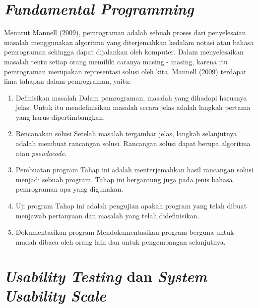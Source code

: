 \section{\textit{Fundamental Programming}}
	Menurut Mannell (2009), pemrograman adalah sebuah proses dari penyelesaian masalah menggunakan algoritma yang diterjemahkan kedalam notasi atau bahasa pemrograman sehingga dapat dijalankan oleh komputer. Dalam menyelesaikan masalah tentu setiap orang memiliki caranya masing - masing, karena itu pemrograman merupakan representasi solusi oleh kita.
	\linebreak\linebreak
	Mannell (2009) terdapat lima tahapan dalam pemrograman, yaitu:
	\begin{enumerate}
		\item Definisikan masalah
			\subitem Dalam pemrograman, masalah yang dihadapi harusnya jelas. Untuk itu mendefinisikan masalah secara jelas adalah langkah pertama yang harus dipertimbangkan.
		\item Rencanakan solusi
			\subitem Setelah masalah tergambar jelas, langkah selanjutnya adalah membuat rancangan solusi. Rancangan solusi dapat berupa algoritma atau \textit{pseudocode}.
		\item Pembuatan program
			\subitem Tahap ini adalah menterjemahkan hasil rancangan solusi menjadi sebuah program. Tahap ini bergantung juga pada jenis bahasa pemrograman apa yang digunakan.
		\item Uji program
			\subitem Tahap ini adalah pengujian apakah program yang telah dibuat menjawab pertanyaan dan masalah yang telah didefinisikan.
		\item Dokumentasikan program
			\subitem Mendokumentasikan program berguna untuk mudah dibaca oleh orang lain dan untuk pengembangan selanjutnya.
	\end{enumerate}
	
\section{\textit{Usability Testing} dan \textit{System Usability Scale}}

